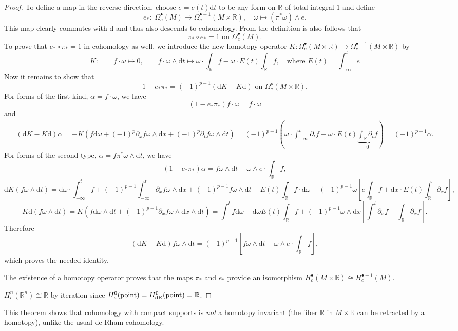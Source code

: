 \documentclass[english,letterpaper]{article}%
\numberwithin{equation}{section}
\numberwithin{figure}{section}
\numberwithin{table}{section}
\theoremstyle{definition}
\theoremstyle{definition}
\theoremstyle{definition}
\theoremstyle{plain}
\theoremstyle{plain}
\theoremstyle{plain}
\theoremstyle{plain}
\theoremstyle{remark}
\theoremstyle{remark}
\newcommand{\bbR}{\mathbb{R}}
\newcommand{\dd}{{\mathrm{d}}}
\begin{document}
\begin{proof}
    To define a map in the reverse direction, choose $e=e(t)\dd t$ to be any form on $\bbR$ of total integral $1$ and define
    \[e_\ast: \; \Omega_c^\bullet(M)\to \Omega_c^{\bullet+1}(M\times\bbR),\quad \omega\mapsto (\pi^\ast \omega)\wedge e.\]
    This map clearly commutes with $\dd$ and thus also descends to cohomology. From the definition is also follows that 
    \[\pi_\ast\circ e_\ast=1 \text{ on }\Omega_c^\bullet(M).\]
    To prove that $e_\ast\circ \pi_\ast=1$ in cohomology as well, we introduce the new homotopy operator $K:\Omega_c^\bullet(M\times\bbR)\to \Omega_c^{\bullet-1}(M\times \bbR)$ by
    \begin{equation}
        K: \quad\quad f\cdot\omega\mapsto 0,    \quad\quad f\cdot \omega\wedge\dd t\mapsto  \omega\cdot\int_\bbR f-\omega\cdot E(t)\int_\bbR f,\quad \text{where } E(t)=\int_{-\infty}^t e
    \end{equation}
    Now it remains to show that 
    \[1-e_\ast\pi_\ast=(-1)^{p-1}(\dd K-K\dd)\text{ on }\Omega_c^p(M\times\bbR).\]
    For forms of the first kind, $\alpha=f\cdot\omega$, we have
    \[(1-e_\ast\pi_\ast)f\cdot\omega=f\cdot\omega\]
    and
    \begin{multline}
        (\dd K-K \dd)\alpha=-K(f\dd\omega+(-1)^p\partial_x f \omega\wedge\dd x+(-1)^p \partial_t f \omega\wedge\dd t)
        =(-1)^{p-1}\left(\omega\cdot \int_{-\infty}^t \partial_t f-\omega\cdot E(t) \underbrace{\int_\bbR \partial_t f}_0\right)=(-1)^{p-1}\alpha.
    \end{multline}
    For forms of the second type, $\alpha=f\pi^\ast \omega \wedge \dd t$, we have
    \[(1-e_\ast\pi_\ast)\alpha=f\omega\wedge\dd t- \omega\wedge e\cdot \int_\bbR f,\]
    \[\dd K(f\omega\wedge\dd t)=\dd\omega\cdot \int_{-\infty}^t f+(-1)^{p-1}\int_{-\infty}^t \partial_x f\omega \wedge \dd x+(-1)^{p-1}f\omega\wedge\dd t-E(t)\int_\bbR f\cdot \dd\omega-(-1)^{p-1}\omega \left[e\int_\bbR f+\dd x\cdot E(t)\int_\bbR \partial_x f\right],\]
    \[K\dd (f\omega\wedge\dd t)=K\left(f\dd \omega\wedge\dd t+(-1)^{p-1}\partial_x f \omega\wedge\dd x\wedge\dd t\right)=\int^t f\dd\omega-\dd\omega E(t)\int_\bbR f+(-1)^{p-1}\omega\wedge\dd x\left[ \int^t\partial_x f- \int_\bbR \partial_x f\right].\]
    Therefore
    \[(\dd K-K \dd )f\omega\wedge\dd t=(-1)^{p-1}\left[f\omega\wedge\dd t -\omega\wedge e\cdot\int_\bbR f\right],\]
    which proves the needed identity.
    
    The existence of a homotopy operator proves that the maps $\pi_\ast$ and $e_\ast$ provide an isomorphism
    $H_c^\bullet(M\times\bbR)\cong H_c^{\bullet -1}(M)$.
    
    $H_c^n(\bbR^n)\cong \bbR$ by iteration since $H_c^0(\text{point})=H_{\rm dR}^0(\text{point})=\bbR$.
\end{proof}
\begin{rem}
    This theorem shows that cohomology with compact supports is \emph{not} a homotopy invariant (the fiber $\bbR$ in $M\times\bbR$ can be retracted by a homotopy), unlike the usual de Rham cohomology.
\end{rem}
\end{document}
